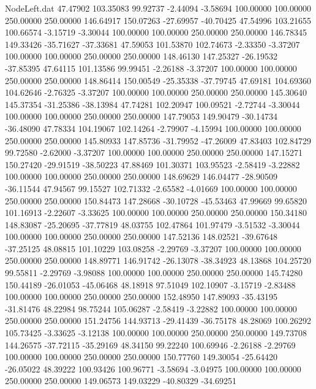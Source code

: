\begin{filecontents}{NodeLeft.dat}
  47.47902  103.35083   99.92737    -2.44094   -3.58694  100.00000  100.00000  250.00000  250.00000  146.64917  150.07263  -27.69957  -40.70425
  47.54996  103.21655  100.66574    -3.15719   -3.30044  100.00000  100.00000  250.00000  250.00000  146.78345  149.33426  -35.71627  -37.33681
  47.59053  101.53870  102.74673    -2.33350   -3.37207  100.00000  100.00000  250.00000  250.00000  148.46130  147.25327  -26.19532  -37.85395
  47.64115  101.13586   99.99451    -2.26188   -3.37207  100.00000  100.00000  250.00000  250.00000  148.86414  150.00549  -25.35338  -37.79745
  47.69181  104.69360  104.62646    -2.76325   -3.37207  100.00000  100.00000  250.00000  250.00000  145.30640  145.37354  -31.25386  -38.13984
  47.74281  102.20947  100.09521    -2.72744   -3.30044  100.00000  100.00000  250.00000  250.00000  147.79053  149.90479  -30.14734  -36.48090
  47.78334  104.19067  102.14264    -2.79907   -4.15994  100.00000  100.00000  250.00000  250.00000  145.80933  147.85736  -31.79952  -47.26009
  47.83403  102.84729   99.72580    -2.62000   -3.37207  100.00000  100.00000  250.00000  250.00000  147.15271  150.27420  -29.91519  -38.50223
  47.88469  101.30371  103.95523    -2.58419   -3.22882  100.00000  100.00000  250.00000  250.00000  148.69629  146.04477  -28.90509  -36.11544
  47.94567   99.15527  102.71332    -2.65582   -4.01669  100.00000  100.00000  250.00000  250.00000  150.84473  147.28668  -30.10728  -45.53463
  47.99669   99.65820  101.16913    -2.22607   -3.33625  100.00000  100.00000  250.00000  250.00000  150.34180  148.83087  -25.20695  -37.77819
  48.03755  102.47864  101.97479    -3.51532   -3.30044  100.00000  100.00000  250.00000  250.00000  147.52136  148.02521  -39.67648  -37.25125
  48.08815  101.10229  103.08258    -2.29769   -3.37207  100.00000  100.00000  250.00000  250.00000  148.89771  146.91742  -26.13078  -38.34923
  48.13868  104.25720   99.55811    -2.29769   -3.98088  100.00000  100.00000  250.00000  250.00000  145.74280  150.44189  -26.01053  -45.06468
  48.18918   97.51049  102.10907    -3.15719   -2.83488  100.00000  100.00000  250.00000  250.00000  152.48950  147.89093  -35.43195  -31.81476
  48.22984   98.75244  105.06287    -2.58419   -3.22882  100.00000  100.00000  250.00000  250.00000  151.24756  144.93713  -29.41439  -36.75178
  48.28069  100.26292  105.73425    -3.33625   -3.12138  100.00000  100.00000  250.00000  250.00000  149.73708  144.26575  -37.72115  -35.29169
  48.34150   99.22240  100.69946    -2.26188   -2.29769  100.00000  100.00000  250.00000  250.00000  150.77760  149.30054  -25.64420  -26.05022
  48.39222  100.93426  100.96771    -3.58694   -3.04975  100.00000  100.00000  250.00000  250.00000  149.06573  149.03229  -40.80329  -34.69251

\end{filecontents}
